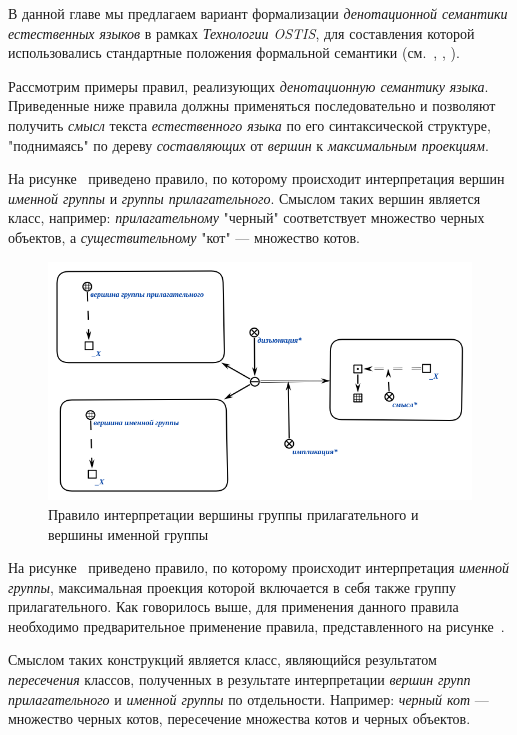 В данной главе мы предлагаем вариант формализации \textit{денотационной семантики} \textit{естественных языков} в рамках \textit{Технологии OSTIS}, для составления которой использовались стандартные положения формальной семантики (см.~, , ).

Рассмотрим примеры правил, реализующих \textit{денотационную семантику} \textit{языка}.
Приведенные ниже правила должны применяться последовательно и позволяют получить \textit{смысл} текста \textit{естественного языка} по его синтаксической структуре, "поднимаясь"{} по дереву \textit{составляющих} от \textit{вершин} к \textit{максимальным проекциям}.

На рисунке~\textit{} приведено правило, по которому происходит интерпретация вершин \textit{именной группы} и \textit{группы прилагательного}.
Смыслом таких вершин является класс, например: \textit{прилагательному} "черный"{} соответствует множество черных объектов, а \textit{существительному} "кот"{} --- множество котов.

\begin{figure}[H]
    \centering
    \includegraphics[scale=0.8]{images/part2/chapter_lang/d_sem_1}
    \caption{Правило интерпретации вершины группы прилагательного и вершины именной группы}
    \label{fig:d_sem_1}
\end{figure}

На рисунке~\textit{} приведено правило, по которому происходит интерпретация \textit{именной группы}, максимальная проекция которой включается в себя также группу прилагательного.
Как говорилось выше, для применения данного правила необходимо предварительное применение правила, представленного на рисунке~\textit{}.

Смыслом таких конструкций является класс, являющийся результатом \textit{пересечения} классов, полученных в результате интерпретации \textit{вершин} \textit{групп прилагательного} и \textit{именной группы} по отдельности.
Например: \textit{черный кот} --- множество черных котов, пересечение множества котов и черных объектов. %

